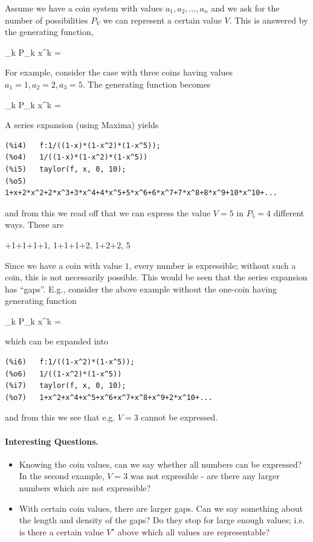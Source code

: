 Assume we have a coin system with values $a_1, a_2, \ldots, a_n$ and we ask for the number of possibilities $P_V$ we can represent a certain value $V$. This is answered by the generating function,

\bee
\sum_{k } P_k x^k = 
\eee

For example, consider the case with three coins having values $a_1=1, a_2=2, a_3=5$. The generating function becomes

\bee
\sum_{k } P_k x^k = 
\eee

A series expansion (using Maxima) yields

\begin{verbatim}
(%i4)	f:1/((1-x)*(1-x^2)*(1-x^5));
(%o4)	1/((1-x)*(1-x^2)*(1-x^5))
(%i5)	taylor(f, x, 0, 10);
(%o5)	1+x+2*x^2+2*x^3+3*x^4+4*x^5+5*x^6+6*x^7+7*x^8+8*x^9+10*x^10+...
\end{verbatim}

and from this we read off that we can express the value $V=5$ in $P_5=4$ different ways. These are

+1+1+1+1, 1+1+1+2, 1+2+2, 5
\eee

Since we have a coin with value $1$, every number is expressible; without such a coin, this is not necessarily possible. This would be seen that the series expansion has ``gaps''. E.g., consider the above example without the one-coin having generating function

\bee
\sum_{k } P_k x^k = 
\eee

which can be expanded into 

\begin{verbatim}
(%i6)	f:1/((1-x^2)*(1-x^5));
(%o6)	1/((1-x^2)*(1-x^5))
(%i7)	taylor(f, x, 0, 10);
(%o7)	1+x^2+x^4+x^5+x^6+x^7+x^8+x^9+2*x^10+...
\end{verbatim}

and from this we see that e.g. $V=3$ cannot be expressed.

\paragraph{Interesting Questions.}

\begin{itemize}
  \item Knowing the coin values, can we say whether all numbers can be expressed? In the second example, $V=3$ was not expresible - are there any larger numbers which are not expressible?
  \item With certain coin values, there are larger gaps. Can we say something about the length and density of the gaps? Do they stop for large enough values; i.e. is there a certain value $V^\star$ above which all values are representable? 
\end{itemize}

